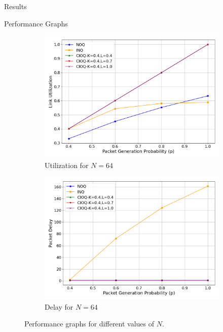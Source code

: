 \begin{section}{Results}
\begin{subsection}{Performance Graphs}
\begin{figure}[htbp]
        \begin{subfigure}{0.45\textwidth}
            \centering
            \includegraphics[width=\linewidth]{./figures/fig2/utilization_plot_N_64.png}
            \caption{Utilization for \(N = 64\)}
            \label{fig:utilization_64}
        \end{subfigure}
        \hfill
        \begin{subfigure}{0.45\textwidth}
            \centering
            \includegraphics[width=\linewidth]{./figures/fig2/delay_plot_N_64.png}
            \caption{Delay for \(N = 64\)}
            \label{fig:delay_64}
        \end{subfigure}

        \caption{Performance graphs for different values of \(N\).}
        \label{fig:performance_graphs}
    \end{figure}
    

\end{subsection}
\end{section}
